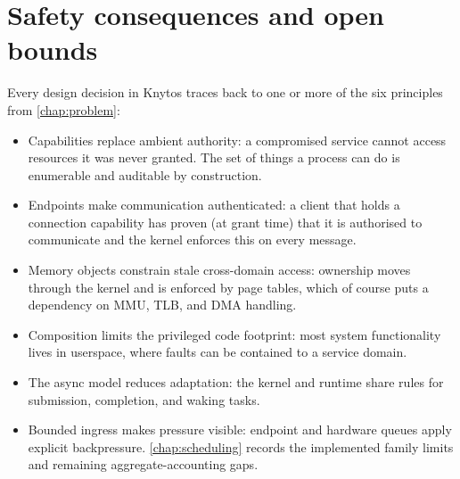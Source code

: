 \section{Safety consequences and open bounds}

Every design decision in Knytos traces back to one or more of the six
principles from \autoref{chap:problem}:

\begin{itemize}
    \item Capabilities replace ambient authority: a compromised service
        cannot access resources it was never granted. The set of things a process
        can do is enumerable and auditable by construction.
    \item Endpoints make communication authenticated: a client that holds
        a connection capability has proven (at grant time) that it is authorised
        to communicate and the kernel enforces this on every message.
    \item Memory objects constrain stale cross-domain access: ownership moves
        through the kernel and is enforced by page tables, which of course puts
        a dependency on MMU, TLB, and DMA handling.
    \item Composition limits the privileged code footprint: most system functionality
        lives in userspace, where faults can be contained to a service domain.
    \item The async model reduces adaptation: the kernel and runtime share
        rules for submission, completion, and waking tasks.
    \item Bounded ingress makes pressure visible: endpoint and hardware queues
        apply explicit backpressure. \autoref{chap:scheduling} records the
        implemented family limits and remaining aggregate-accounting gaps.
\end{itemize}

\endinput
